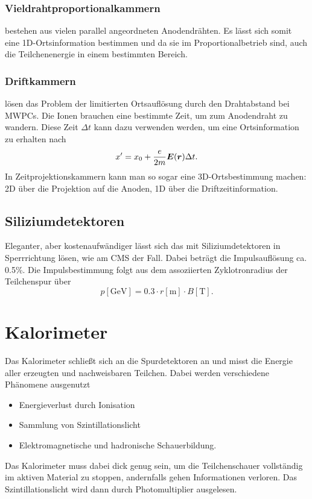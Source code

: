 \subsubsection{Vieldrahtproportionalkammern}
bestehen aus vielen parallel angeordneten Anodendrähten. Es lässt sich somit eine 1D-Ortsinformation bestimmen und da sie im Proportionalbetrieb sind, auch die Teilchenenergie in einem bestimmten Bereich.

\subsubsection{Driftkammern}
lösen das Problem der limitierten Ortsauflösung durch den Drahtabstand bei MWPCs. Die Ionen brauchen eine bestimmte Zeit, um zum Anodendraht zu wandern. Diese Zeit $\Delta t$ kann dazu verwenden werden, um eine Ortsinformation zu erhalten nach
\begin{equation*}
	x' = x_0 + \frac{e}{2m}\boldsymbol{E}(\boldsymbol{r})\Delta t.
\end{equation*}
In Zeitprojektionskammern kann man so sogar eine 3D-Ortsbestimmung machen: 2D über die Projektion auf die Anoden, 1D über die Driftzeitinformation.

\subsection{Siliziumdetektoren}
Eleganter, aber kostenaufwändiger lässt sich das mit Siliziumdetektoren in Sperrrichtung lösen, wie am CMS der Fall.
Dabei beträgt die Impulsauflösung ca. 0.5\%.
Die Impulsbestimmung folgt aus dem assoziierten Zyklotronradius der Teilchenspur über
\begin{equation*}
	p[\si{\GeV}] = 0.3\cdot r[\si{\meter}] \cdot B[\si{\tesla}].
\end{equation*}

\section{Kalorimeter}
Das Kalorimeter schließt sich an die Spurdetektoren an und misst die Energie aller erzeugten und nachweisbaren Teilchen.
Dabei werden verschiedene Phänomene ausgenutzt
\begin{itemize}
	\item Energieverlust durch Ionisation
	\item Sammlung von Szintillationslicht
	\item Elektromagnetische und hadronische Schauerbildung.
\end{itemize}
Das Kalorimeter muss dabei dick genug sein, um die Teilchenschauer vollständig im aktiven Material zu stoppen, andernfalls gehen Informationen verloren.
Das Szintillationslicht wird dann durch Photomultiplier ausgelesen.

